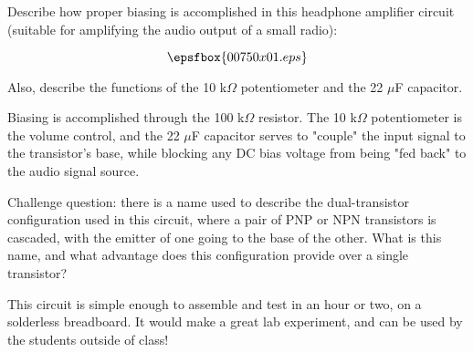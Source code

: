 

Describe how proper biasing is accomplished in this headphone amplifier circuit (suitable for amplifying the audio output of a small radio):

$$\epsfbox{00750x01.eps}$$

Also, describe the functions of the 10 k$\Omega$ potentiometer and the 22 $\mu$F capacitor.







Biasing is accomplished through the 100 k$\Omega$ resistor.  The 10 k$\Omega$ potentiometer is the volume control, and the 22 $\mu$F capacitor serves to "couple" the input signal to the transistor's base, while blocking any DC bias voltage from being "fed back" to the audio signal source.

\vskip 10pt

Challenge question: there is a name used to describe the dual-transistor configuration used in this circuit, where a pair of PNP or NPN transistors is cascaded, with the emitter of one going to the base of the other.  What is this name, and what advantage does this configuration provide over a single transistor?







This circuit is simple enough to assemble and test in an hour or two, on a solderless breadboard.  It would make a great lab experiment, and can be used by the students outside of class!





